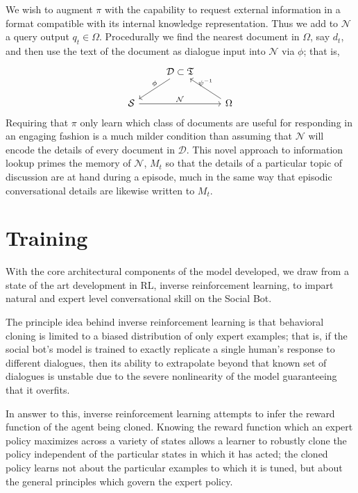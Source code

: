 \documentclass{article} %
\theoremstyle{named}
\def\scriptd{{\mathcal D}}
\def\scriptn{{\mathcal N}}
\def\scripts{{\mathcal S}}
\begin{document}
\begin{enumerate}
We wish to augment $ \pi $ with the capability to request external information in a format compatible with its internal knowledge representation. Thus we add to $\scriptn$ a query output $ q_t \in \Omega $. Procedurally we find the nearest document in $\Omega$, say $d_t$, and then use the text of the document as dialogue input into $\scriptn$ via $\phi$; that is,
\begin{equation*}
  \begin{tikzcd}
    & \scriptd \subset \mathfrak{T} \arrow{ld}[above]{\phi} & \\
    \scripts \arrow{rr}{\scriptn} & & \Omega \arrow{lu}[above]{\psi^{-1}}
  \end{tikzcd}
\end{equation*}
Requiring that $\pi$ only learn which class of documents are useful for responding in an engaging fashion is a much milder condition than assuming that $\scriptn$ will encode the details of every document in $\scriptd$. This novel approach to information lookup primes the memory of $\scriptn$, $M_t$ so that the details of a particular topic of discussion are at hand during a episode, much in the same way that episodic conversational details are likewise written to $M_t$.
\end{enumerate}

\section{Training}
With the core architectural components of the model developed, we draw from a state of the art development in RL, inverse reinforcement learning\cite{ng2000algorithms}, to impart natural and expert level conversational skill on the Social Bot.

The principle idea behind inverse reinforcement learning is that behavioral cloning is limited to a biased distribution of only expert examples; that is, if the social bot’s model is trained to exactly replicate a single human's response to different dialogues, then its ability to extrapolate beyond that known set of dialogues is unstable due to the severe nonlinearity of the model guaranteeing that it overfits.

In answer to this, inverse reinforcement learning attempts to infer the reward function of the agent being cloned. Knowing the reward function which an expert policy maximizes across a variety of states allows a learner to robustly clone the policy independent of the particular states in which it has acted; the cloned policy learns not about the particular examples to which it is tuned, but about the general principles which govern the expert policy.
\end{document}
